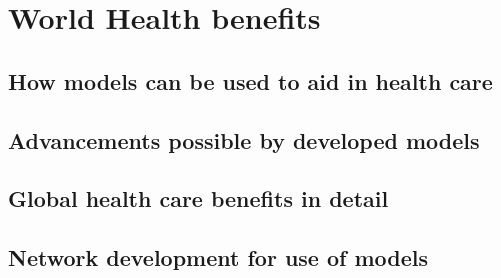 \chapter{World Health benefits}
\section{How models can be used to aid in health care}
\section{Advancements possible by developed models}
\section{Global health care benefits in detail}
\section{Network development for use of models}